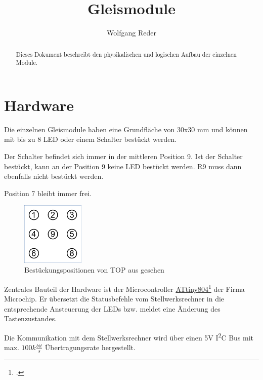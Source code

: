 \documentclass[10pt,a4paper]{article}
\author{Wolfgang Reder}
\title{Gleismodule}
\begin{document}
\maketitle
\begin{abstract}
Dieses Dokument beschreibt den physikalischen und logischen Aufbau der einzelnen Module.
\end{abstract}
\tableofcontents
\newpage
\listoffigures
\newpage
\listoftables
\newpage
\section{Hardware}
Die einzelnen Gleismodule haben eine Grundfläche von 30x30 mm und können mit bis zu 8 LED oder einem Schalter bestückt werden.

Der Schalter befindet sich immer in der mittleren Position 9. Ist der Schalter bestückt, kann an der Position 9 keine LED bestückt werden. R9 muss dann ebenfalls nicht bestückt werden.

Position 7 bleibt immer frei.
\begin{figure}[hbtp]
\centering
\includegraphics[width=3cm]{../folien/symbol.png}
\caption[Bestückungspositionen]{Bestückungspositionen von TOP aus gesehen}
\end{figure}

Zentrales Bauteil der Hardware ist der Microcontroller \href{https://www.microchip.com/wwwproducts/en/ATtiny804}{ATtiny804}\footcite{Microchip2019a} der Firma Microchip. Er übersetzt die Statusbefehle vom Stellwerksrechner in die entsprechende Ansteuerung der LEDs bzw. meldet eine Änderung des Tastenzustandes.

Die Kommunikation mit dem Stellwerksrechner wird über einen 5V I\textsuperscript{2}C Bus mit max. $100k\frac{bit}{s}$ Übertragungsrate hergestellt. 
\end{document}
